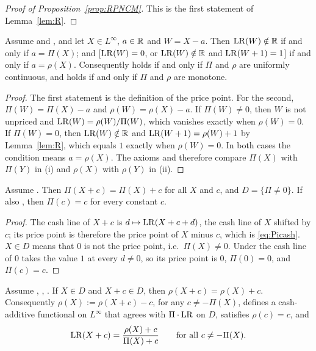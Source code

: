 \begin{proof}[Proof of Proposition~\ref{prop:RPNCM}]
This is the first statement of Lemma~\ref{lem:R}. \qedhere
\end{proof}

\begin{lemma}\label{lem:offsets}
Assume \axPe{} and \axR, and let $X\in L^\infty$, $a\in\mathbb R$ and $W=X-a$. Then $\mathrm{LR}(W)\notin\mathbb R$ if and only if
$a=\Pi(X)$; and [$\mathrm{LR}(W)=0$, or $\mathrm{LR}(W)\notin\mathbb R$ and $\mathrm{LR}(W+1)=1$] if and only if $a=\rho(X)$. Consequently \axRC{}
holds if and only if $\Pi$ and $\rho$ are uniformly continuous, and \axRM{} holds if and only if $\Pi$ and $\rho$ are
monotone.
\end{lemma}

\begin{proof}
The first statement is the definition of the price point. For the second, $\Pi(W)=\Pi(X)-a$ and $\rho(W)=\rho(X)-a$.
If $\Pi(W)\ne0$, then $W$ is not unpriced and $\mathrm{LR}(W)=\rho(W)/\Pi(W)$, which vanishes exactly when $\rho(W)=0$. If
$\Pi(W)=0$, then $\mathrm{LR}(W)\notin\mathbb R$ and $\mathrm{LR}(W+1)=\rho(W)+1$ by Lemma~\ref{lem:R}, which equals $1$ exactly when
$\rho(W)=0$. In both cases the condition means $a=\rho(X)$. The axioms \axRC{} and \axRM{} therefore compare
$\Pi(X)$ with $\Pi(Y)$ in (i) and $\rho(X)$ with $\rho(Y)$ in (ii). \qedhere
\end{proof}

\begin{lemma}\label{lem:premium}
Assume \axP. Then $\Pi(X+c)=\Pi(X)+c$ for all $X$ and $c$, and $D=\{\Pi\ne0\}$. If also \axN, then
$\Pi(c)=c$ for every constant $c$.
\end{lemma}

\begin{proof}
The cash line of $X+c$ is $d\mapsto\mathrm{LR}(X+c+d)$, the cash line of $X$ shifted by $c$; its price point is
therefore the price point of $X$ minus $c$, which is \eqref{eq:Picash}. $X\in D$ means that $0$ is not the
price point, i.e.\ $\Pi(X)\ne0$. Under \axN{} the cash line of $0$ takes the value $1$ at every $d\neq0$, so
its price point is $0$, $\Pi(0)=0$, and $\Pi(c)=c$. \qedhere
\end{proof}

\begin{lemma}\label{lem:implied}
Assume \axP, \axN, \axCM. If $X\in D$ and $X+c\in D$, then $\rho(X+c)=\rho(X)+c$. Consequently
$\rho(X):=\rho(X+c)-c$, for any $c\ne-\Pi(X)$, defines a cash-additive functional on $L^\infty$ that agrees
with $\Pi\cdot\mathrm{LR}$ on $D$, satisfies $\rho(c)=c$, and
\begin{equation}\label{eq:mobius}
 \mathrm{LR}(X+c)=\frac{\rho(X)+c}{\Pi(X)+c}\qquad\text{for all }c\ne-\Pi(X).
\end{equation}
\end{lemma}

